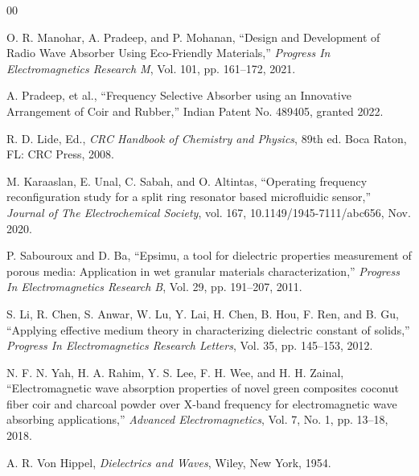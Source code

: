 \documentclass[11pt, a4paper]{article}
\begin{document}
\newpage
\begin{thebibliography}{00}

 O. R. Manohar, A. Pradeep, and P. Mohanan, ``Design and Development of Radio Wave Absorber Using Eco-Friendly Materials,'' \textit{Progress In Electromagnetics Research M}, Vol. 101, pp. 161--172, 2021.

 A. Pradeep, et al., ``Frequency Selective Absorber using an Innovative Arrangement of Coir and Rubber,'' Indian Patent No. 489405, granted 2022.

 R. D. Lide, Ed., \textit{CRC Handbook of Chemistry and Physics}, 89th ed. Boca Raton, FL: CRC Press, 2008.

 M. Karaaslan, E. Unal, C. Sabah, and O. Altintas, ``Operating frequency reconfiguration study for a split ring resonator based microfluidic sensor,'' \textit{Journal of The Electrochemical Society}, vol. 167, 10.1149/1945-7111/abc656, Nov. 2020.

 P. Sabouroux and D. Ba, ``Epsimu, a tool for dielectric properties measurement of porous media: Application in wet granular materials characterization,'' \textit{Progress In Electromagnetics Research B}, Vol. 29, pp. 191--207, 2011.

 S. Li, R. Chen, S. Anwar, W. Lu, Y. Lai, H. Chen, B. Hou, F. Ren, and B. Gu, ``Applying effective medium theory in characterizing dielectric constant of solids,'' \textit{Progress In Electromagnetics Research Letters}, Vol. 35, pp. 145--153, 2012.

 N. F. N. Yah, H. A. Rahim, Y. S. Lee, F. H. Wee, and H. H. Zainal, ``Electromagnetic wave absorption properties of novel green composites coconut fiber coir and charcoal powder over X-band frequency for electromagnetic wave absorbing applications,'' \textit{Advanced Electromagnetics}, Vol. 7, No. 1, pp. 13--18, 2018.

 A. R. Von Hippel, \textit{Dielectrics and Waves}, Wiley, New York, 1954.

\end{thebibliography}
\end{document}
